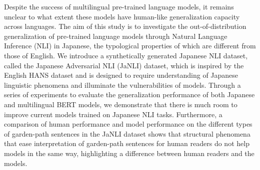 Despite the success of multilingual pre-trained language models, it remains unclear to what extent these models have human-like generalization capacity across languages. The aim of this study is to investigate the out-of-distribution generalization of pre-trained language models through Natural Language Inference (NLI) in Japanese, the typological properties of which are different from those of English. We introduce a synthetically generated Japanese NLI dataset, called the Japanese Adversarial NLI (JaNLI) dataset, which is inspired by the English HANS dataset and is designed to require understanding of Japanese linguistic phenomena and illuminate the vulnerabilities of models. Through a series of experiments to evaluate the generalization performance of both Japanese and multilingual BERT models, we demonstrate that there is much room to improve current models trained on Japanese NLI tasks. Furthermore, a comparison of human performance and model performance on the different types of garden-path sentences in the JaNLI dataset shows that structural phenomena that ease interpretation of garden-path sentences for human readers do not help models in the same way, highlighting a difference between human readers and the models.
